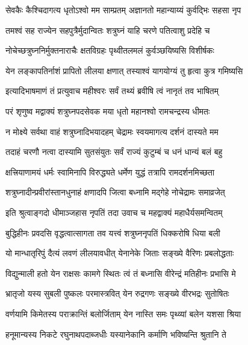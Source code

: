 \twolineshloka
{सेवकैः कैश्चिदागत्य धृतोऽश्वो मम साम्प्रतम्}
{अज्ञानतो महान्याय्यं कुर्वद्भिः सहसा नृप}%

\twolineshloka
{तमश्वं सह राज्येन सहपुत्रैर्मुदान्वितः}
{शत्रुघ्नं याहि चरणे पतित्वाशु प्रदेहि च}%

\twolineshloka
{नोचेच्छत्रुघ्ननिर्मुक्तनाराचैः क्षतविग्रहः}
{पृथ्वीतलमलं कुर्वञ्छयिष्यसि विशीर्षकः}%

\twolineshloka
{येन लङ्कापतिर्नाशं प्रापितो लीलया क्षणात्}
{तस्याश्वं यागयोग्यं तु हृत्वा कुत्र गमिष्यसि}%


\twolineshloka
{इत्यादिभाषमाणं तं प्रत्युवाच महीश्वरः}
{सर्वं तथ्यं ब्रवीषि त्वं नानृतं तव भाषितम्}%

\twolineshloka
{परं शृणुष्व मद्वाक्यं शत्रुघ्नपदसेवक}
{मया धृतो महानश्वो रामचन्द्रस्य धीमतः}%

\twolineshloka
{न मोक्ष्ये सर्वथा वाहं शत्रुघ्नादिभयादहम्}
{चेद्रामः स्वयमागत्य दर्शनं दास्यते मम}%

\twolineshloka
{तदाहं चरणौ नत्वा दास्यामि सुतसंयुतः}
{सर्वं राज्यं कुटुम्बं च धनं धान्यं बलं बहु}%

\twolineshloka
{क्षत्त्रियाणामयं धर्मः स्वामिनापि विरुद्ध्यते}
{धर्मेण युद्धं तत्रापि रामदर्शनमिच्छता}%

\twolineshloka
{शत्रुघ्नादीन्प्रवीरांस्तानधुनाहं क्षणादपि}
{जित्वा बध्नामि मद्गेहे नोचेद्रामः समाव्रजेत्}%


\twolineshloka
{इति श्रुत्वाङ्गदो धीमाञ्जहास नृपतिं तदा}
{उवाच च महद्वाक्यं महाधैर्यसमन्वितम्}%


\twolineshloka
{बुद्धिहीनः प्रवदसि वृद्धत्वात्सागता तव}
{यत्त्वं शत्रुघ्ननृपतिं धिक्करोषि धिया बली}%

\twolineshloka
{यो मान्धातृरिपुं दैत्यं लवणं लीलयावधीत्}
{येनानेके जिताः सङ्ख्ये वैरिणः प्रबलोद्धताः}%

\twolineshloka
{विद्युन्माली हतो येन राक्षसः कामगे स्थितः}
{त्वं तं बध्नासि वीरेन्द्रं मतिहीनः प्रभासि मे}%

\twolineshloka
{भ्रातृजो यस्य सुबली पुष्कलः परमास्त्रवित्}
{येन रुद्रगणः सङ्ख्ये वीरभद्रः सुतोषितः}%

\twolineshloka
{वर्णयामि किमेतस्य पराक्रान्तिं बलोर्जिताम्}
{येन नास्ति समः पृथ्व्यां बलेन यशसा श्रिया}%

\twolineshloka
{हनूमान्यस्य निकटे रघुनाथपदाब्जधीः}
{यस्यानेकानि कर्माणि भविष्यन्ति श्रुतानि ते}%

